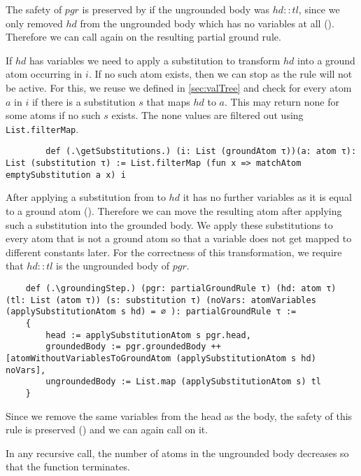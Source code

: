     The safety of $pgr$ is preserved by \moveAtomWithoutVariables if the ungrounded body was $hd::tl$, since we only removed $hd$ from the ungrounded body which has no variables at all (\moveAtomWithoutVariablesPreservesSafety).
    Therefore we can call \exploreGrounding again on the resulting partial ground rule.

    If $hd$ has variables we need to apply a substitution to transform $hd$ into a ground atom occurring in $i$. If no such atom exists, then we can stop as the rule will not be active. For this, we reuse \matchAtom we defined in \cref{sec:valTree} and check for every atom $a$ in $i$ if there is a substitution $s$ that maps $hd$ to $a$. This may return none for some atoms if no such $s$ exists. The none values are filtered out using \lstinline|List.filterMap|.

    \begin{lstlisting}
        def (.\getSubstitutions.) (i: List (groundAtom τ))(a: atom τ): List (substitution τ) := List.filterMap (fun x => matchAtom emptySubstitution a x) i
    \end{lstlisting}

    After applying a substitution from \getSubstitutions to $hd$ it has no further variables as it is equal to a ground atom (\inGetSubstitutionsImplNoVars). Therefore we can move the resulting atom after applying such a substitution into the grounded body. We apply these substitutions to every atom that is not a ground atom so that a variable does not get mapped to different constants later. For the correctness of this transformation, we require that $hd::tl$ is the ungrounded body of $pgr$.

    \begin{lstlisting}
    def (.\groundingStep.) (pgr: partialGroundRule τ) (hd: atom τ) (tl: List (atom τ)) (s: substitution τ) (noVars: atomVariables (applySubstitutionAtom s hd) = ∅ ): partialGroundRule τ :=
    {
        head := applySubstitutionAtom s pgr.head,
        groundedBody := pgr.groundedBody ++ [atomWithoutVariablesToGroundAtom (applySubstitutionAtom s hd) noVars],
        ungroundedBody := List.map (applySubstitutionAtom s) tl
    }

    \end{lstlisting}

    Since we remove the same variables from the head as the body, the safety of this rule is preserved (\groundingStepPreservesSafety) and we can again call \exploreGrounding on it.

    In any recursive call, the number of atoms in the ungrounded body decreases so that the function terminates.

